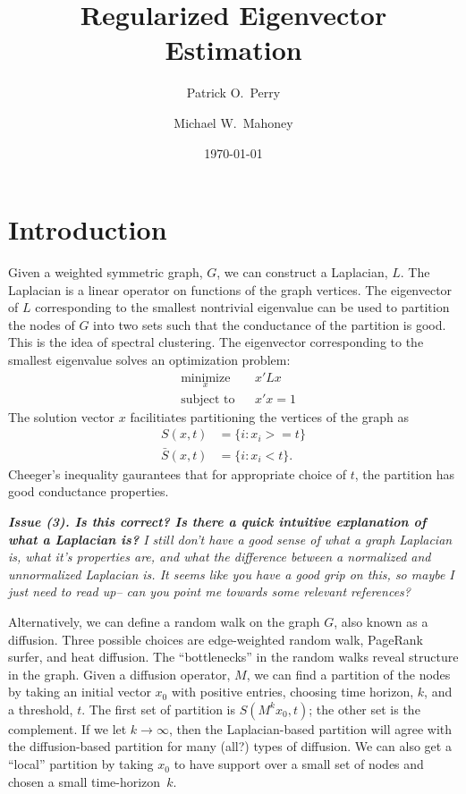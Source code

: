\documentclass{article}
\begin{document}
\title{
  Regularized Eigenvector Estimation
}
\author{
  Patrick O.\ Perry
  \and
  Michael W.\ Mahoney
}
\date{
  \today
}
\maketitle

\begin{abstract}
\end{abstract}

\section{Introduction}
\label{S:introduction}

Given a weighted symmetric graph, $G$, we can construct a Laplacian, $L$.  The Laplacian is a linear operator on functions of the graph vertices.  The eigenvector of $L$ corresponding to the smallest nontrivial eigenvalue can be used to partition the nodes of $G$ into two sets such that the conductance of the partition is good.  This is the idea of spectral clustering.   The eigenvector corresponding
to the smallest eigenvalue solves an optimization problem:
\[
\begin{aligned}
  & \underset{x}{\text{minimize}}
  & & x' L x \\
  & \text{subject to}
  & & x' x = 1
\end{aligned}
\]
The solution vector $x$ facilitiates partitioning the vertices of the graph as
\begin{align*}
  S(x,t)      &= \{ i : x_i >= t \} \\
  \bar S(x,t) &= \{ i : x_i < t \}.
\end{align*}
Cheeger's inequality gaurantees that for appropriate choice of $t$, the partition has good conductance properties.

\textit{\textbf{Issue (3).  Is this correct?  Is there a quick intuitive explanation of what a Laplacian is?} I still don't have a good sense of what a graph Laplacian is, what it's properties are, and what the difference between a normalized and unnormalized Laplacian is.  It seems like you have a good grip on this, so maybe I just need to read up-- can you point me towards some relevant references?}

Alternatively, we can define a random walk on the graph $G$, also known as a diffusion.  Three possible choices are edge-weighted random walk, PageRank surfer, and heat diffusion.  The ``bottlenecks'' in the random walks reveal structure in the graph.  Given a diffusion operator, $M$, we can find a partition of the nodes by taking an initial vector $x_0$ with positive entries, choosing time horizon, $k$, and a threshold, $t$.  The first set of partition is $S(M^k x_0, t)$; the other set is the complement.  If we let $k\to \infty$, then the Laplacian-based partition will agree with the diffusion-based partition for many (all?) types of diffusion.  We can also get a ``local'' partition by taking $x_0$ to have support over a small set of nodes and chosen a small time-horizon~$k$.
\end{document}
